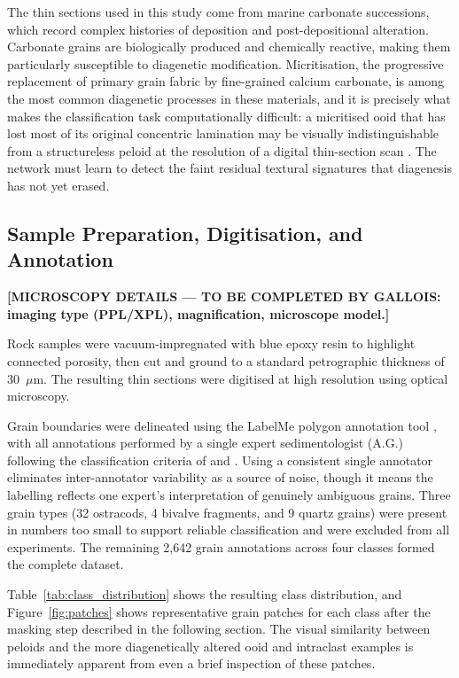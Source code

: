 \documentclass[a4paper,fleqn]{cas-dc}
\begin{document}
The thin sections used in this study come from marine carbonate successions, which record complex histories of deposition and post-depositional alteration. Carbonate grains are biologically produced and chemically reactive, making them particularly susceptible to diagenetic modification. Micritisation, the progressive replacement of primary grain fabric by fine-grained calcium carbonate, is among the most common diagenetic processes in these materials, and it is precisely what makes the classification task computationally difficult: a micritised ooid that has lost most of its original concentric lamination may be visually indistinguishable from a structureless peloid at the resolution of a digital thin-section scan \citep{flugel2010}. The network must learn to detect the faint residual textural signatures that diagenesis has not yet erased.

\subsection{Sample Preparation, Digitisation, and Annotation}
\textbf{[MICROSCOPY DETAILS --- TO BE COMPLETED BY GALLOIS: imaging type (PPL/XPL), magnification, microscope model.]}

Rock samples were vacuum-impregnated with blue epoxy resin to highlight connected porosity, then cut and ground to a standard petrographic thickness of 30~$\mu$m. The resulting thin sections were digitised at high resolution using optical microscopy.

Grain boundaries were delineated using the LabelMe polygon annotation tool \citep{labelme}, with all annotations performed by a single expert sedimentologist (A.G.) following the classification criteria of \citet{flugel2010} and \citet{scholle2003carbonate}. Using a consistent single annotator eliminates inter-annotator variability as a source of noise, though it means the labelling reflects one expert's interpretation of genuinely ambiguous grains. Three grain types (32 ostracods, 4 bivalve fragments, and 9 quartz grains) were present in numbers too small to support reliable classification and were excluded from all experiments. The remaining 2,642 grain annotations across four classes formed the complete dataset.

Table~\ref{tab:class_distribution} shows the resulting class distribution, and Figure~\ref{fig:patches} shows representative grain patches for each class after the masking step described in the following section. The visual similarity between peloids and the more diagenetically altered ooid and intraclast examples is immediately apparent from even a brief inspection of these patches.
\end{document}
